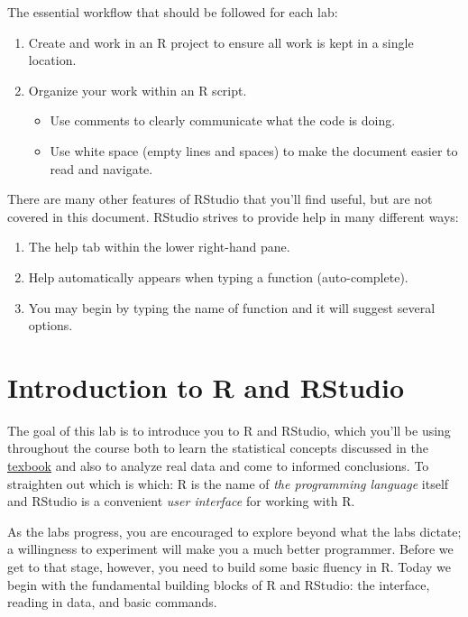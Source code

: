 \documentclass[]{book}
\providecommand{\tightlist}{%
  \setlength{\itemsep}{0pt}\setlength{\parskip}{0pt}}
\theoremstyle{definition}
\theoremstyle{definition}
\theoremstyle{definition}
\theoremstyle{remark}
\begin{document}
The essential workflow that should be followed for each lab:

\begin{enumerate}
\def\labelenumi{\arabic{enumi}.}
\tightlist
\item
  Create and work in an R project to ensure all work is kept in a single
  location.
\item
  Organize your work within an R script.

  \begin{itemize}
  \tightlist
  \item
    Use comments to clearly communicate what the code is doing.
  \item
    Use white space (empty lines and spaces) to make the document easier
    to read and navigate.
  \end{itemize}
\end{enumerate}

There are many other features of RStudio that you'll find useful, but
are not covered in this document. RStudio strives to provide help in
many different ways:

\begin{enumerate}
\def\labelenumi{\arabic{enumi}.}
\tightlist
\item
  The help tab within the lower right-hand pane.
\item
  Help automatically appears when typing a function (auto-complete).
\item
  You may begin by typing the name of function and it will suggest
  several options.
\end{enumerate}

\chapter{Introduction to R and
RStudio}\label{introduction-to-r-and-rstudio}

The goal of this lab is to introduce you to R and RStudio, which you'll
be using throughout the course both to learn the statistical concepts
discussed in the
\href{https://www.openintro.org/stat/textbook.php}{texbook} and also to
analyze real data and come to informed conclusions. To straighten out
which is which: R is the name of \emph{the programming language} itself
and RStudio is a convenient \emph{user interface} for working with R.

As the labs progress, you are encouraged to explore beyond what the labs
dictate; a willingness to experiment will make you a much better
programmer. Before we get to that stage, however, you need to build some
basic fluency in R. Today we begin with the fundamental building blocks
of R and RStudio: the interface, reading in data, and basic commands.
\end{document}
